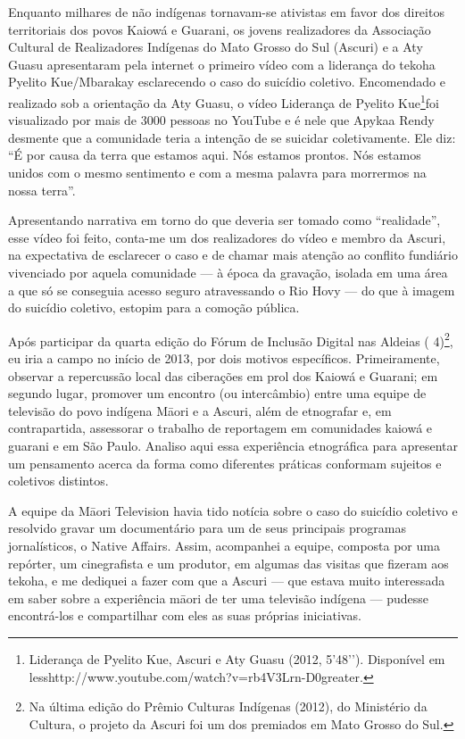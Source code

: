 {{Enquanto milhares de não indígenas tornavam-se ativistas em favor dos
direitos territoriais dos povos Kaiowá e Guarani, os jovens
realizadores da Associação Cultural de Realizadores Indígenas do Mato
Grosso do Sul (Ascuri) e a Aty Guasu apresentaram pela internet o
primeiro vídeo com a liderança do tekoha Pyelito Kue/Mbarakay
esclarecendo o caso do suicídio coletivo. Encomendado e realizado sob a
orientação da Aty Guasu, o vídeo Liderança de Pyelito
Kue\footnote{Liderança de Pyelito Kue, Ascuri e Aty Guasu (2012,
5’48’’). Disponível em
{less}http://www.youtube.com/watch?v=rb4V3Lrn-D0{greater}.}foi
visualizado por mais de 3000 pessoas no YouTube e é nele que Apykaa
Rendy desmente que a comunidade teria a intenção de se suicidar
coletivamente. Ele diz: ``É por causa da terra que estamos aqui. Nós
estamos prontos. Nós estamos unidos com o mesmo sentimento e com a
mesma palavra para morrermos na nossa terra''.

Apresentando narrativa em torno do que deveria ser tomado como
``realidade'', esse vídeo foi feito, conta-me um dos realizadores do
vídeo e membro da Ascuri, na expectativa de esclarecer o caso e de
chamar mais atenção ao conflito fundiário vivenciado por aquela
comunidade --- à época da gravação, isolada em uma área a que só se
conseguia acesso seguro atravessando o Rio Hovy --- do que à imagem do
suicídio coletivo, estopim para a comoção pública.

Após participar da quarta edição do Fórum de Inclusão Digital nas
Aldeias ( 4)\footnote{Na última edição do Prêmio Culturas Indígenas
(2012), do Ministério da Cultura, o projeto da Ascuri foi um dos
premiados em Mato Grosso do Sul.}, eu iria a campo no início de 2013,
por dois motivos específicos. Primeiramente, observar a repercussão
local das ciberações em prol dos Kaiowá e Guarani; em segundo lugar,
promover um encontro (ou intercâmbio) entre uma equipe de televisão do
povo indígena M\=aori e a Ascuri, além de etnografar e, em
contrapartida, assessorar o trabalho de reportagem em comunidades
kaiowá e guarani e em São Paulo. Analiso aqui essa experiência
etnográfica para apresentar um pensamento acerca da forma como
diferentes práticas conformam sujeitos e coletivos distintos.

A equipe da M\=aori Television havia tido notícia sobre o caso do
suicídio coletivo e resolvido gravar um documentário para um de seus
principais programas jornalísticos, o Native Affairs. Assim, acompanhei
a equipe, composta por uma repórter, um cinegrafista e um produtor, em
algumas das visitas que fizeram aos tekoha, e me dediquei a fazer com
que a Ascuri --- que estava muito interessada em saber sobre a
experiência m\=aori de ter uma televisão indígena --- pudesse
encontrá-los e compartilhar com eles as suas próprias iniciativas.

}}

